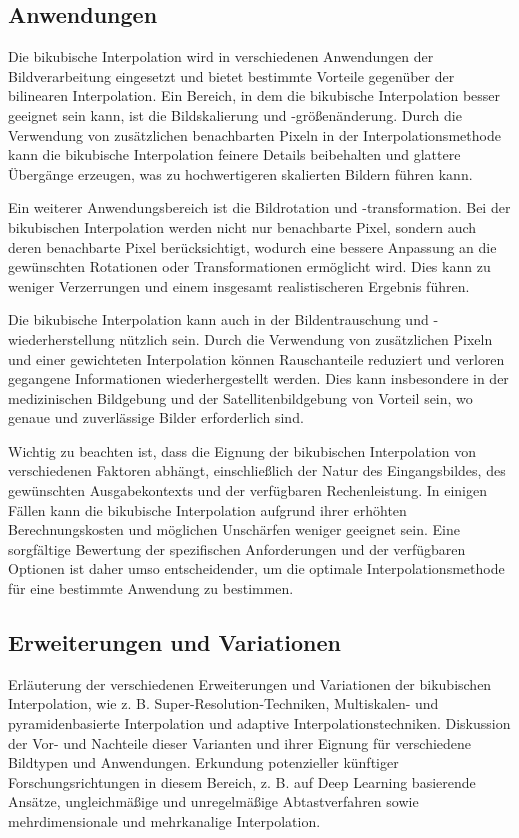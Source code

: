    \subsection{Anwendungen}

Die bikubische Interpolation wird in verschiedenen Anwendungen der Bildverarbeitung eingesetzt und bietet bestimmte Vorteile gegenüber der bilinearen Interpolation.
Ein Bereich, in dem die bikubische Interpolation besser geeignet sein kann, ist die Bildskalierung und -größenänderung.
Durch die Verwendung von zusätzlichen benachbarten Pixeln in der Interpolationsmethode kann die bikubische Interpolation feinere Details beibehalten und glattere Übergänge erzeugen, was zu hochwertigeren skalierten Bildern führen kann.

Ein weiterer Anwendungsbereich ist die Bildrotation und -transformation.
Bei der bikubischen Interpolation werden nicht nur benachbarte Pixel, sondern auch deren benachbarte Pixel berücksichtigt, wodurch eine bessere Anpassung an die gewünschten Rotationen oder Transformationen ermöglicht wird.
Dies kann zu weniger Verzerrungen und einem insgesamt realistischeren Ergebnis führen.

Die bikubische Interpolation kann auch in der Bildentrauschung und -wiederherstellung nützlich sein.
Durch die Verwendung von zusätzlichen Pixeln und einer gewichteten Interpolation können Rauschanteile reduziert und verloren gegangene Informationen wiederhergestellt werden.
Dies kann insbesondere in der medizinischen Bildgebung und der Satellitenbildgebung von Vorteil sein, wo genaue und zuverlässige Bilder erforderlich sind.

Wichtig zu beachten ist, dass die Eignung der bikubischen Interpolation von verschiedenen Faktoren abhängt, einschließlich der Natur des Eingangsbildes, des gewünschten Ausgabekontexts und der verfügbaren Rechenleistung.
In einigen Fällen kann die bikubische Interpolation aufgrund ihrer erhöhten Berechnungskosten und möglichen Unschärfen weniger geeignet sein.
Eine sorgfältige Bewertung der spezifischen Anforderungen und der verfügbaren Optionen ist daher umso entscheidender, um die optimale Interpolationsmethode für eine bestimmte Anwendung zu bestimmen.

    \subsection{Erweiterungen und Variationen}

    Erläuterung der verschiedenen Erweiterungen und Variationen der bikubischen Interpolation, wie z.
    B. Super-Resolution-Techniken, Multiskalen- und pyramidenbasierte Interpolation und adaptive Interpolationstechniken.
    Diskussion der Vor- und Nachteile dieser Varianten und ihrer Eignung für verschiedene Bildtypen und Anwendungen.
    Erkundung potenzieller künftiger Forschungsrichtungen in diesem Bereich, z.
    B. auf Deep Learning basierende Ansätze, ungleichmäßige und unregelmäßige Abtastverfahren sowie mehrdimensionale und mehrkanalige Interpolation.


